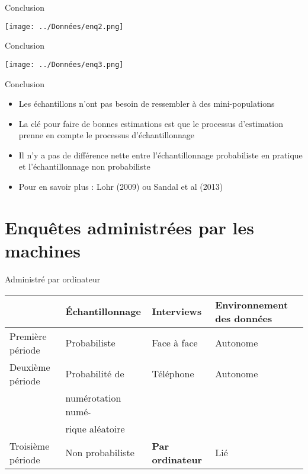 \documentclass[
  ignorenonframetext,
]{beamer}
\providecommand{\tightlist}{%
  \setlength{\itemsep}{0pt}\setlength{\parskip}{0pt}}
\begin{document}
\begin{frame}{Conclusion}
\protect\hypertarget{conclusion}{}

\texttt{[image: ../Données/enq2.png]}

\end{frame}

\begin{frame}{Conclusion}
\protect\hypertarget{conclusion-1}{}

\texttt{[image: ../Données/enq3.png]}

\end{frame}

\begin{frame}{Conclusion}
\protect\hypertarget{conclusion-2}{}

\begin{itemize}
\tightlist
\item
  Les échantillons n'ont pas besoin de ressembler à des mini-populations
\item
  La clé pour faire de bonnes estimations est que le processus
  d'estimation prenne en compte le processus d'échantillonnage
\item
  Il n'y a pas de différence nette entre l'échantillonnage probabiliste
  en pratique et l'échantillonnage non probabiliste
\item
  Pour en savoir plus : Lohr (2009) ou Sandal et al (2013)
\end{itemize}

\end{frame}

\hypertarget{enquuxeates-administruxe9es-par-les-machines}{%
\section{Enquêtes administrées par les
machines}\label{enquuxeates-administruxe9es-par-les-machines}}

\begin{frame}{Administré par ordinateur}
\protect\hypertarget{administruxe9-par-ordinateur}{}

\begin{longtable}[]{@{}llll@{}}
\toprule
& Échantillonnage & Interviews & Environnement des
données\tabularnewline
\midrule
\endhead
Première période & Probabiliste & Face à face & Autonome\tabularnewline
Deuxième période & Probabilité de & Téléphone & Autonome\tabularnewline
& numérotation numé- & &\tabularnewline
& rique aléatoire & &\tabularnewline
Troisième période & Non probabiliste & \textbf{Par ordinateur} &
Lié\tabularnewline
\bottomrule
\end{longtable}

\end{frame}
\end{document}
